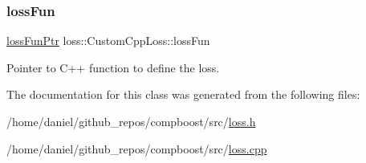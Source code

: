 \subsubsection{\texorpdfstring{loss\+Fun}{lossFun}}
{\footnotesize\ttfamily \hyperlink{namespaceloss_a6658cb84c8687d6dd0904c00801542f3}{loss\+Fun\+Ptr} loss\+::\+Custom\+Cpp\+Loss\+::loss\+Fun\hspace{0.3cm}{\ttfamily [private]}}



Pointer to {\ttfamily C++} function to define the loss. 



The documentation for this class was generated from the following files\+:\begin{DoxyCompactItemize}
\item 
/home/daniel/github\+\_\+repos/compboost/src/\hyperlink{loss_8h}{loss.\+h}\item 
/home/daniel/github\+\_\+repos/compboost/src/\hyperlink{loss_8cpp}{loss.\+cpp}\end{DoxyCompactItemize}
